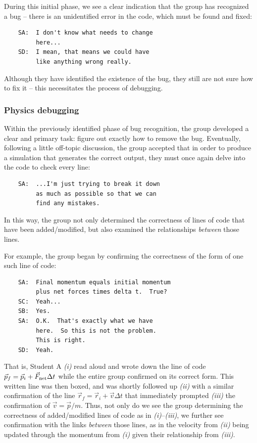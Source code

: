 \documentclass{msuphddissertation}
\begin{document}
\begin{doublespace}
During this initial phase, we see a clear indication that the group has recognized a bug -- there is an unidentified error in the code, which must be found and fixed:  \begin{verbatim}
    SA:  I don't know what needs to change
         here...
    SD:  I mean, that means we could have
         like anything wrong really.
\end{verbatim}  Although they have identified the existence of the bug, they still are not sure how to fix it -- this necessitates the process of debugging.

\subsubsection{Physics debugging}

Within the previously identified phase of bug recognition, the group developed a clear and primary task: figure out exactly how to remove the bug.  Eventually, following a little off-topic discussion, the group accepted that in order to produce a simulation that generates the correct output, they must once again delve into the code to check every line:  \begin{verbatim}
    SA:  ...I'm just trying to break it down
         as much as possible so that we can
         find any mistakes.
\end{verbatim}  In this way, the group not only determined the correctness of lines of code that have been added/modified, but also examined the relationships \emph{between} those lines.

For example, the group began by confirming the correctness of the form of one such line of code:  \begin{verbatim}
    SA:  Final momentum equals initial momentum
         plus net forces times delta t.  True?
    SC:  Yeah...
    SB:  Yes.
    SA:  O.K.  That's exactly what we have
         here.  So this is not the problem.
         This is right.
    SD:  Yeah.
\end{verbatim}  That is, Student A \emph{(i)} read aloud and wrote down the line of code $\vec{p}_{f}=\vec{p}_{i}+\vec{F}_{\rm net}\Delta t$ while the entire group confirmed on its correct form.  This written line was then boxed, and was shortly followed up \emph{(ii)} with a similar confirmation of the line $\vec{r}_{f}=\vec{r}_{i}+\vec{v}\Delta t$ that immediately prompted \emph{(iii)} the confirmation of $\vec{v}=\vec{p}/m$.  Thus, not only do we see the group determining the correctness of added/modified lines of code as in \emph{(i)}--\emph{(iii)}, we further see confirmation with the links \emph{between} those lines, as in the velocity from \emph{(ii)} being updated through the momentum from \emph{(i)} given their relationship from \emph{(iii)}.


\end{doublespace}
\end{document}
